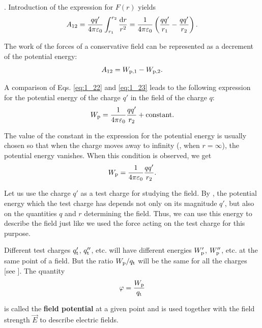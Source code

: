 . Introduction of the expression for $F(r)$ yields
\begin{equation}\label{eq:1_22}
	A_{12} = \frac{qq'}{4\pi\varepsilon_0} \int_{r_1}^{r_2} \frac{\mathrm{d} r}{r^2} = \frac{1}{4\pi\varepsilon_0} \left(
	\frac{qq'}{r_1} - \frac{qq'}{r_2}
	\right).
\end{equation}

The work of the forces of a conservative field can be represented as a decrement of the potential energy:
\begin{equation}\label{eq:1_23}
	A_{12} = W_{\text{p,$1$}} - W_{\text{p,$2$}}.
\end{equation}

\noindent
A comparison of Eqs. \eqref{eq:1_22} and \eqref{eq:1_23} leads to the following expression for the potential energy of the charge $q'$ in the field of the charge $q$:
\begin{equation*}
	W_{\text{p}} = \frac{1}{4\pi\varepsilon_0} \frac{qq'}{r_2} + \text{constant}.
\end{equation*}

\noindent
The value of the constant in the expression for the potential energy is usually chosen so that when the charge moves away to infinity (\ie, when $r=\infty$), the potential energy vanishes. When this condition is observed, we get
\begin{equation}\label{eq:1_24}
	W_{\text{p}} = \frac{1}{4\pi\varepsilon_0} \frac{qq'}{r_2}.
\end{equation}

Let us use the charge $q'$ as a test charge for studying the field. By , the potential energy which the test charge has depends not only on its magnitude $q'$, but also on the quantities $q$ and $r$ determining the field. Thus, we can use this energy to describe the field just like we used the force acting on the test charge for this purpose.

Different test charges $q_{\text{t}}'$, $q_{\text{t}}''$, etc. will have different energies $W_{\text{p}}'$, $W_{\text{p}}''$, etc. at the same point of a field. But the ratio $W_{\text{p}}/q_{\text{t}}$ will be the same for all the charges [see ]. The quantity
\begin{equation}\label{eq:1_25}
	\varphi = \frac{W_{\text{p}}}{q_{\text{t}}}
\end{equation}

\noindent
is called the \textbf{field potential} at a given point and is used together with the field strength $\vec{E}$ to describe electric fields.

